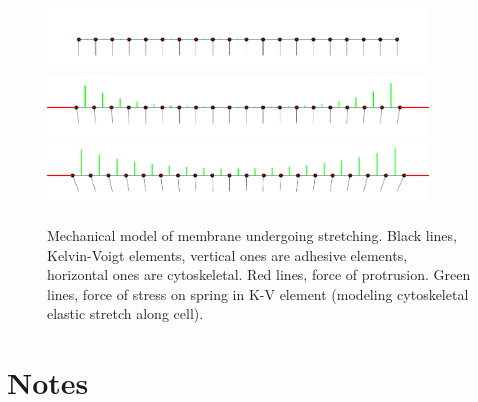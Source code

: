 \documentclass{article}
\begin{document}
\begin{figure}
    \centering
    \includegraphics[width=0.9\textwidth]{mech-0.pdf}
    \includegraphics[width=0.9\textwidth]{mech-10.pdf}
    \includegraphics[width=0.9\textwidth]{mech-200.pdf}
    \caption{ Mechanical model of membrane undergoing stretching. Black lines,
        Kelvin-Voigt elements, vertical ones are adhesive elements, horizontal
        ones are cytoskeletal. Red lines, force of protrusion. Green lines, force of
        stress on spring in K-V element
        (modeling cytoskeletal elastic stretch along cell).
        \label{fig:mech-t}}
\end{figure}


\section{Notes}

\end{document}
